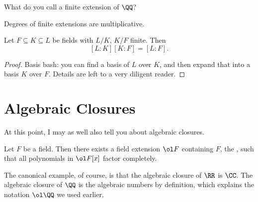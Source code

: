 \begin{ques}
	What do you call a finite extension of $\QQ$?
\end{ques}

Degrees of finite extensions are multiplicative.
\begin{theorem}
	Let $F \subseteq K \subseteq L$ be fields with $L/K$, $K/F$ finite. Then
	\[ [L:K][K:F] = [L:F]. \]
\end{theorem}
\begin{proof}
	Basis bash: you can find a basis of $L$ over $K$, and then expand that into a basis $K$ over $F$.
	Details are left to a very diligent reader.
\end{proof}

\section{Algebraic Closures}
At this point, I may as well also tell you about algebraic closures.
\begin{theorem}
	Let $F$ be a field.
	Then there exists a field extension $\ol F$ containing $F$, the ,
	such that all polynomials in $\ol F[x]$ factor completely.
\end{theorem}
\begin{example}
	\listhack
	\begin{enumerate}[(a)]
	\ii The canonical example, of course, is that the algebraic closure of $\RR$ is $\CC$.
	\ii The algebraic closure of $\QQ$ is the algebraic numbers by definition,
	which explains the notation $\ol\QQ$ we used earlier.
	\end{enumerate}
\end{example}

